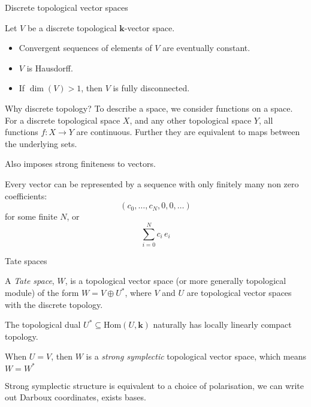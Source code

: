     \begin{frame}{Discrete topological vector spaces}
    
    \begin{lem} 
        Let \(V\) be a  discrete topological \( \mathbf{k}\)-vector space. 
        \begin{itemize}
            \item Convergent sequences of elements of \(V\) are eventually constant. 
            \item \(V\) is Hausdorff.
            \item If \( \dim(V) > 1\), then \(V\) is fully disconnected.
        \end{itemize}
        \end{lem}
    \end{frame}



    \begin{frame}{Why discrete topology?}
    To describe a space, we consider functions on a space. For a discrete topological space \(X\), and any other topological space \(Y\), all functions \(f : X \rightarrow Y\) are continuous. Further they are equivalent to maps between the underlying sets.
    
    Also imposes strong finiteness to vectors.
    
    Every vector can be represented by a sequence with only finitely many non zero coefficients:
    \[ (c_0, \dots , c_N, 0, 0, \dots)\]
    for some finite \(N\), or 
    \[ \sum^{N}_{i=0} c_i\, e_i \]
    \end{frame}
    
 

    \begin{frame}{Tate spaces}
        \begin{defn}
            A \emph{Tate space}, \(W\), is a topological vector space (or more generally topological module) of the form
            \(W= V \oplus U^*\), where \(V\) and \(U\) are topological vector spaces with the discrete topology.
        \end{defn}
    
    The topological dual \(U^{*} \subseteq \mathrm{Hom}(U,\mathbf{k})\) naturally has locally linearly compact topology.  
    \end{frame}
    
    \begin{frame}
        When \(U = V\), then \(W\) is a \emph{strong symplectic} topological vector space, which means \(W = W^{*}\)
        
        Strong symplectic structure is equivalent to a choice of polarisation, we can write out Darboux coordinates, exists bases. 

    \end{frame}

